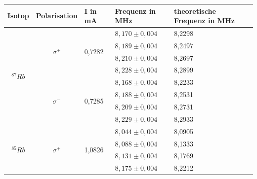 \documentclass[bigchapter,colorback,accentcolor=tud4b,linedtoc,11pt]{tudreport}
\begin{document}
\begin{table}[H]
  \begin{center}
  \def\arraystretch{1.25}
  \begin{tabular}{c|c l|ll}
      Isotop                      & Polarisation                  & I in mA                 & Frequenz in MHz   & theoretische Frequenz in MHz \\ \hline
      \multirow{8}{*}{$^{87}Rb$}  & \multirow{4}{*}{$\sigma^{+}$} & \multirow{4}{*}{0,7282} & $8,170 \pm 0,004$ & 8,2298                       \\ 
                                  &                               &                         & $8,189 \pm 0,004$ & 8,2497                       \\ 
                                  &                               &                         & $8,210 \pm 0,004$ & 8,2697                       \\ 
                                  &                               &                         & $8,228 \pm 0,004$ & 8,2899                       \\ \cline{2-5}
                                  & \multirow{4}{*}{$\sigma^{-}$} & \multirow{4}{*}{0,7285} & $8,168 \pm 0,004$ & 8,2233                       \\ 
                                  &                               &                         & $8,188 \pm 0,004$ & 8,2531                       \\ 
                                  &                               &                         & $8,209 \pm 0,004$ & 8,2731                       \\ 
                                  &                               &                         & $8,229 \pm 0,004$ & 8,2933                       \\ \hline
      \multirow{12}{*}{$^{85}Rb$} & \multirow{6}{*}{$\sigma^{+}$} & \multirow{6}{*}{1,0826} & $8,044 \pm 0,004$ & 8,0905                       \\ 
                                  &                               &                         & $8,088 \pm 0,004$ & 8,1333                       \\ 
                                  &                               &                         & $8,131 \pm 0,004$ & 8,1769                       \\ 
                                  &                               &                         & $8,175 \pm 0,004$ & 8,2212                       \\ 

\end{tabular}
\end{center}
\end{table}
\end{document}
